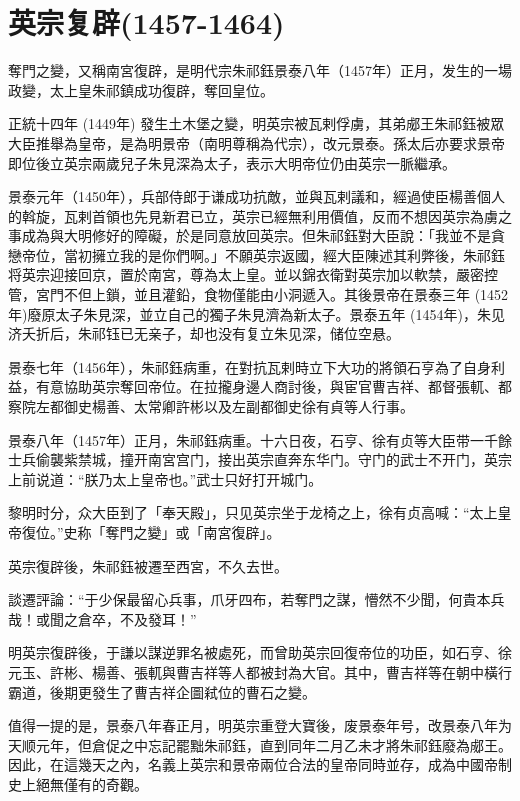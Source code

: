 
\section{英宗复辟\tiny(1457-1464)}

奪門之變，又稱南宮復辟，是明代宗朱祁鈺景泰八年（1457年）正月，发生的一場政變，太上皇朱祁鎮成功復辟，奪回皇位。

正統十四年 (1449年) 發生土木堡之變，明英宗被瓦剌俘虜，其弟郕王朱祁鈺被眾大臣推舉為皇帝，是為明景帝（南明尊稱為代宗），改元景泰。孫太后亦要求景帝即位後立英宗兩歲兒子朱見深為太子，表示大明帝位仍由英宗一脈繼承。

景泰元年（1450年），兵部侍郎于谦成功抗敵，並與瓦剌議和，經過使臣楊善個人的斡旋，瓦剌首領也先見新君已立，英宗已經無利用價值，反而不想因英宗為虜之事成為與大明修好的障礙，於是同意放回英宗。但朱祁鈺對大臣說：「我並不是貪戀帝位，當初擁立我的是你們啊。」不願英宗返國，經大臣陳述其利弊後，朱祁鈺将英宗迎接回京，置於南宮，尊為太上皇。並以錦衣衛對英宗加以軟禁，嚴密控管，宮門不但上鎖，並且灌鉛，食物僅能由小洞遞入。其後景帝在景泰三年 (1452年)廢原太子朱見深，並立自己的獨子朱見濟為新太子。景泰五年 (1454年)，朱见济夭折后，朱祁钰已无亲子，却也没有复立朱见深，储位空悬。

景泰七年（1456年），朱祁鈺病重，在對抗瓦剌時立下大功的將領石亨為了自身利益，有意協助英宗奪回帝位。在拉攏身邊人商討後，與宦官曹吉祥、都督張軏、都察院左都御史楊善、太常卿許彬以及左副都御史徐有貞等人行事。

景泰八年（1457年）正月，朱祁鈺病重。十六日夜，石亨、徐有贞等大臣带一千餘士兵偷襲紫禁城，撞开南宮宫门，接出英宗直奔东华门。守门的武士不开门，英宗上前说道：“朕乃太上皇帝也。”武士只好打开城门。

黎明时分，众大臣到了「奉天殿」，只见英宗坐于龙椅之上，徐有贞高喊：“太上皇帝復位。”史称「奪門之變」或「南宮復辟」。

英宗復辟後，朱祁鈺被遷至西宮，不久去世。

談遷評論：“于少保最留心兵事，爪牙四布，若奪門之謀，懵然不少聞，何貴本兵哉！或聞之倉卒，不及發耳！”

明英宗復辟後，于謙以謀逆罪名被處死，而曾助英宗回復帝位的功臣，如石亨、徐元玉、許彬、楊善、張軏與曹吉祥等人都被封為大官。其中，曹吉祥等在朝中橫行霸道，後期更發生了曹吉祥企圖弒位的曹石之變。

值得一提的是，景泰八年春正月，明英宗重登大寶後，废景泰年号，改景泰八年为天顺元年，但倉促之中忘記罷黜朱祁鈺，直到同年二月乙未才將朱祁鈺廢為郕王。因此，在這幾天之內，名義上英宗和景帝兩位合法的皇帝同時並存，成為中國帝制史上絕無僅有的奇觀。

